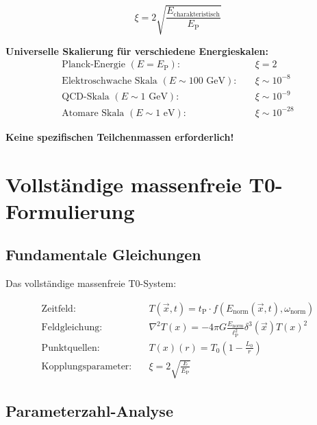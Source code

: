\documentclass[12pt,a4paper]{article}
\newcommand{\Tfield}{T(x)}
\newcommand{\Tfieldt}{T(\vec{x},t)}
\newcommand{\Tzero}{T_0}
\newcommand{\vecx}{\vec{x}}
\newcommand{\lP}{\ell_{\text{P}}}
\newcommand{\tP}{t_{\text{P}}}
\newcommand{\EP}{E_{\text{P}}}
\newcommand{\xipar}{\xi}
\begin{document}
	\begin{equation}
		\boxed{\xipar = 2\sqrt{\frac{E_{\text{charakteristisch}}}{\EP}}}
		\label{eq:xi_mass_free}
	\end{equation}
	
	\textbf{Universelle Skalierung für verschiedene Energieskalen:}
	\begin{align}
		\text{Planck-Energie } (E = \EP): \quad &\xipar = 2 \\
		\text{Elektroschwache Skala } (E \sim 100 \text{ GeV}): \quad &\xipar \sim 10^{-8} \\
		\text{QCD-Skala } (E \sim 1 \text{ GeV}): \quad &\xipar \sim 10^{-9} \\
		\text{Atomare Skala } (E \sim 1 \text{ eV}): \quad &\xipar \sim 10^{-28}
	\end{align}
	
	\textbf{Keine spezifischen Teilchenmassen erforderlich!}
	
	\section{Vollständige massenfreie T0-Formulierung}
	\label{sec:complete_formulation}
	
	\subsection{Fundamentale Gleichungen}
	\label{subsec:fundamental_equations}
	
	Das vollständige massenfreie T0-System:
	
	\begin{tcolorbox}[colback=blue!5!white,colframe=blue!75!black,title=Massenfreies T0-Modell]
		\begin{align}
			\text{Zeitfeld:} \quad &\Tfieldt = \tP \cdot f(E_{\text{norm}}(\vecx,t), \omega_{\text{norm}}) \\
			\text{Feldgleichung:} \quad &\nabla^2 \Tfield = -4\pi G \frac{E_{\text{norm}}}{\lP^2} \delta^3(\vecx) \Tfield^2 \\
			\text{Punktquellen:} \quad &\Tfield(r) = \Tzero\left(1 - \frac{L_0}{r}\right) \\
			\text{Kopplungsparameter:} \quad &\xipar = 2\sqrt{\frac{E}{\EP}}
		\end{align}
	\end{tcolorbox}
	
	\subsection{Parameterzahl-Analyse}
	\label{subsec:parameter_count}
	
\end{document}
